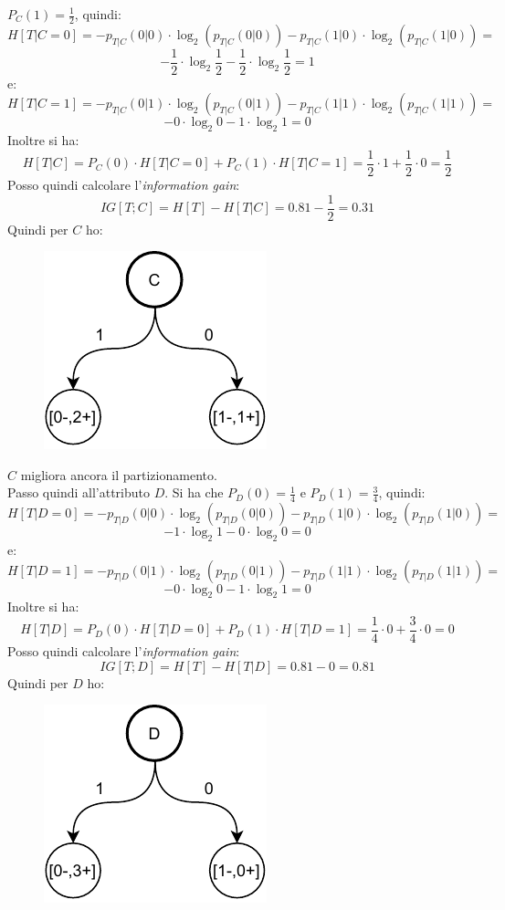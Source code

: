 \begin{esempio}
  $P_C(1)=\frac{1}{2}$, quindi:
  \[H[T|C=0]=-p_{T|C}(0|0)\cdot \log_2(p_{T|C}(0|0))-p_{T|C}(1|0)\cdot
    \log_2(p_{T|C}(1|0))=\]
  \[-\frac{1}{2}\cdot \log_2 \frac{1}{2}-\frac{1}{2}\cdot \log_2 \frac{1}{2}=1\]
  e:
  \[H[T|C=1]=-p_{T|C}(0|1)\cdot \log_2(p_{T|C}(0|1))-p_{T|C}(1|1)\cdot
    \log_2(p_{T|C}(1|1))=\]
  \[-0\cdot \log_2 0-1\cdot \log_2 1=0\]
  Inoltre si ha:
  \[H[T|C]=P_C(0)\cdot H[T|C=0]+P_C(1)\cdot H[T|C=1]=\frac{1}{2}\cdot
    1+\frac{1}{2}\cdot 0=\frac{1}{2}\]
  Posso quindi calcolare l'\textit{information gain}:
  \[IG[T;C]=H[T]-H[T|C]=0.81-\frac{1}{2}=0.31\]
  Quindi per $C$ ho:
  \begin{figure}[H]
    \centering
    \includegraphics[scale = 0.9]{img/id3.pdf}
  \end{figure}
  $C$ migliora ancora il partizionamento.\\
  Passo quindi all'attributo $D$. Si ha che $P_D(0)=\frac{1}{4}$ e
  $P_D(1)=\frac{3}{4}$, quindi:
  \[H[T|D=0]=-p_{T|D}(0|0)\cdot \log_2(p_{T|D}(0|0))-p_{T|D}(1|0)\cdot
    \log_2(p_{T|D}(1|0))=\]
  \[-1\cdot \log_2 1-0\cdot \log_2 0=0\]
  e:
  \[H[T|D=1]=-p_{T|D}(0|1)\cdot \log_2(p_{T|D}(0|1))-p_{T|D}(1|1)\cdot
    \log_2(p_{T|D}(1|1))=\]
  \[-0\cdot \log_2 0-1\cdot \log_2 1=0\]
  Inoltre si ha:
  \[H[T|D]=P_D(0)\cdot H[T|D=0]+P_D(1)\cdot H[T|D=1]=\frac{1}{4}\cdot
    0+\frac{3}{4}\cdot 0=0\]
  Posso quindi calcolare l'\textit{information gain}:
  \[IG[T;D]=H[T]-H[T|D]=0.81-0=0.81\]
  Quindi per $D$ ho:
  \begin{figure}[H]
    \centering
    \includegraphics[scale = 0.9]{img/id4.pdf}

\end{figure}
\end{esempio}
